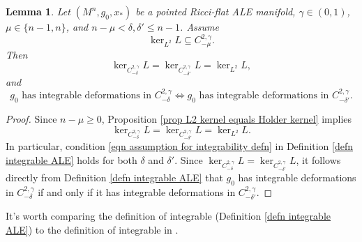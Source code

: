 \documentclass[12pt]{amsart}
\renewcommand{\1}{{\mathbf 1}}
\newtheorem{lemma}[thm]{Lemma}
\theoremstyle{others}
\numberwithin{equation}{section}
\begin{document}
\begin{lemma} \label{lem integrability and changing decay rate}
    Let $(M^n, g_0, x_*)$ be a pointed Ricci-flat ALE manifold, $\gamma \in (0,1)$, $\mu \in \{ n-1, n\}$, and $n - \mu < \delta, \delta' \le n-1$.
    Assume
        $$\ker_{L^2} L \subseteq C^{2,\gamma}_{-\mu}.$$
    Then
        $$\ker_{C^{2, \gamma}_{-\delta}} L = \ker_{C^{2, \gamma}_{-\delta'}} L = \ker_{L^2} L,$$
    and
    \begin{equation*}
        g_0 \text{ has integrable deformations in } C^{2, \gamma}_{-\delta} 
        \iff g_0 \text{ has integrable deformations in } C^{2, \gamma}_{-\delta'} .
    \end{equation*}
\end{lemma}
\begin{proof}
    Since $n - \mu \ge 0$, Proposition \ref{prop L2 kernel equals Holder kernel} implies 
    $$\ker_{C^{2, \gamma}_{-\delta}} L = \ker_{C^{2, \gamma}_{-\delta'}} L = \ker_{L^2} L .$$
    In particular, condition \eqref{eqn assumption for integrability defn} in Definition \ref{defn integrable ALE} holds for both $\delta$ and $\delta'$.
    Since $\ker_{C^{2, \gamma}_{-\delta}} L = \ker_{C^{2, \gamma}_{-\delta'} } L $, it follows directly from Definition \ref{defn integrable ALE} that $g_0$ has integrable deformations in $C^{2, \gamma}_{-\delta}$ if and only if it has integrable deformations in $C^{2, \gamma}_{-\delta'}$.
\end{proof}



It's worth comparing the definition of integrable (Definition \ref{defn integrable ALE}) to the definition of integrable in \cite[Definition 2.4]{DeruelleKroncke20}.
\end{document}
